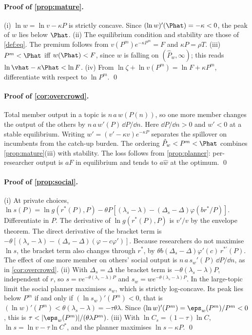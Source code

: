 \paragraph{Proof of \cref{prop:mature}.} (i) $\ln w=\ln v-\kappa P$ is strictly concave. Since $(\ln w)'(\Phat)=-\kappa<0$, the peak of $w$ lies below $\Phat$. (ii) The equilibrium condition and stability are those of \cref{def:eq}. The premium follows from $v(P^m)e^{-\kappa P^m}=F$ and $\kappa P=\rho T$. (iii) $P^m<\Phat$ iff $w(\Phat)<F$, since $w$ is falling on $(\hat P_w,\infty)$; this reads $\ln\vhat-\kappa\Phat<\ln F$. (iv) From $\ln\zeta+\ln v(P^m)=\ln F+\kappa P^m$, differentiate with respect to $\ln P^m$. \qed

\paragraph{Proof of \cref{cor:overcrowd}.} Total member output in a topic is $n\,a\,w(P(n))$, so one more member changes the output of the others by $n\,a\,w'(P)\,\dd P/\dd n$. Here $\dd P/\dd n>0$ and $w'<0$ at a stable equilibrium. Writing $w'=(v'-\kappa v)e^{-\kappa P}$ separates the spillover on incumbents from the catch-up burden. The ordering $\hat P_w<P^m<\Phat$ combines \cref{prop:mature}(iii) with stability. The loss follows from \cref{prop:planner}: per-researcher output is $aF$ in equilibrium and tends to $a\hat w$ at the optimum. \qed

\paragraph{Proof of \cref{prop:social}.} (i) At private choices, $\ln s(P)=\ln g(r^*(P),P)-\theta P[(\lambda_s-\lambda)-(\Delta_s-\Delta)\varphi(br^*/P)]$. Differentiate in $P$. The derivative of $\ln g(r^*(P),P)$ is $v'/v$ by the envelope theorem. The direct derivative of the bracket term is $-\theta[(\lambda_s-\lambda)-(\Delta_s-\Delta)(\varphi-c\varphi')]$. Because researchers do not maximise $\ln s$, the bracket term also changes through $r^*$, by $\theta b(\Delta_s-\Delta)\varphi'(c)\,r^{*\prime}(P)$. The effect of one more member on others' social output is $n\,a\,s_w'(P)\,\dd P/\dd n$, as in \cref{cor:overcrowd}. (ii) With $\Delta_s=\Delta$ the bracket term is $-\theta(\lambda_s-\lambda)P$, independent of $r$, so $s=ve^{-\theta(\lambda_s-\lambda)P}$ and $s_w=we^{-\theta(\lambda_s-\lambda)P}$. In the large-topic limit the social planner maximises $s_w$, which is strictly log-concave. Its peak lies below $P^m$ if and only if $(\ln s_w)'(P^m)<0$, that is $(\ln w)'(P^m)<\theta(\lambda_s-\lambda)=-\tau\theta\lambda$. Since $(\ln w)'(P^m)=\eps_w(P^m)/P^m<0$, this is $\tau<|\eps_w(P^m)|/(\theta\lambda P^m)$. (iii) With $\ln C_s=(1-\tau)\ln C$, $\ln s=\ln v-\tau\ln C^*$, and the planner maximises $\ln s-\kappa P$. \qed

